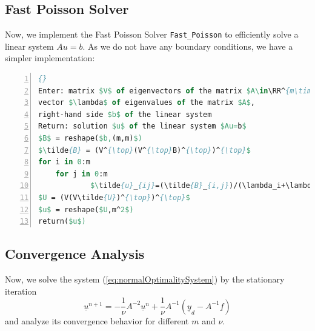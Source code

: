 \documentclass{amsart}
\theoremstyle{definition}
\theoremstyle{remark}
\numberwithin{equation}{section}
\newcommand{\RR}{\mathbb{R}}
\begin{document}

\subsection{Fast Poisson Solver}
Now, we implement the Fast Poisson Solver \texttt{Fast\_Poisson} to efficiently solve a linear system $Au=b$. As we do not have any boundary conditions, we have a simpler implementation:

\begin{lstlisting}[mathescape, language=Pascal, title=Fast\_Poisson,
frame=single, numbers=left, numberstyle=\tiny, tabsize=2,
morekeywords={Enter, Return, elif}, deletekeywords={of}, keywordstyle=\bfseries]{}
Enter: matrix $V$ of eigenvectors of the matrix $A\in\RR^{m\times m}$, 
vector $\lambda$ of eigenvalues of the matrix $A$, 
right-hand side $b$ of the linear system
Return: solution $u$ of the linear system $Au=b$
$B$ = reshape($b,(m,m)$)
$\tilde{B} = (V^{\top}(V^{\top}B)^{\top})^{\top}$
for i in 0:m
	for j in 0:m
			$\tilde{u}_{ij}=(\tilde{B}_{i,j})/(\lambda_i+\lambda_j)$
$U = (V(V\tilde{U})^{\top})^{\top}$
$u$ = reshape($U,m^2$)
return($u$)
\end{lstlisting}


\subsection{Convergence Analysis}
Now, we solve the system (\ref{eq:normalOptimalitySystem}) by the stationary iteration
\begin{equation}
\underline{u}^{n+1} = -\frac{1}{\nu} A^{-2}\underline{u}^n + \frac{1}{\nu} A^{-1} (\underline{y}_d-A^{-1}\underline{f})
\end{equation}
and analyze its convergence behavior for different $m$ and $\nu$.
\end{document}

